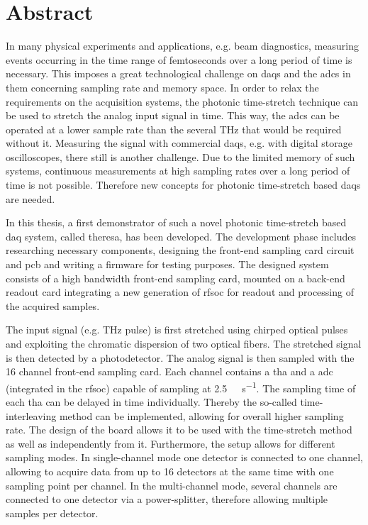 \chapter*{Abstract}
In many physical experiments and applications, e.g. beam diagnostics, measuring events occurring in the time range of femtoseconds over a long period of time is necessary. 
This imposes a great technological challenge on \glspl{daq} and the \glspl{adc} in them concerning sampling rate and memory space.
In order to relax the requirements on the acquisition systems, the photonic time-stretch technique can be used to stretch the analog input signal in time.
This way, the \glspl{adc} can be operated at a lower sample rate than the several \si{\THz} that would be required without it. 
Measuring the signal with commercial \glspl{daq}, e.g. with digital storage oscilloscopes, there still is another challenge.
Due to the limited memory of such systems, continuous measurements at high sampling rates over a long period of time is not possible.
Therefore new concepts for photonic time-stretch based \glspl{daq} are needed.

In this thesis, a first demonstrator of such a novel photonic time-stretch based \gls{daq} system, called \gls{theresa}, has been developed.
The development phase includes researching necessary components, designing the front-end sampling card circuit and \gls{pcb} and writing a firmware for testing purposes.
The designed system consists of a high bandwidth front-end sampling card, mounted on a back-end readout card integrating a new generation of \gls{rfsoc} for readout and processing of the acquired samples.

The input signal (e.g. \si{\tera \hertz} pulse) is first stretched using chirped optical pulses and exploiting the chromatic dispersion of two optical fibers.
The stretched signal is then detected by a photodetector.
The analog signal is then sampled with the 16 channel front-end sampling card.
Each channel contains a \gls{tha} and a \gls{adc} (integrated in the \gls{rfsoc}) capable of sampling at \SI{2.5}{\giga \sample \per \second}.
The sampling time of each \gls{tha} can be delayed in time individually. 
Thereby the so-called time-interleaving method can be implemented, allowing for overall higher sampling rate.
The design of the board allows it to be used with the time-stretch method as well as independently from it.
Furthermore, the setup allows for different sampling modes.
In single-channel mode one detector is connected to one channel, allowing to acquire data from up to 16 detectors at the same time with one sampling point per channel.
In the multi-channel mode, several channels are connected to one detector via a power-splitter, therefore allowing multiple samples per detector.

